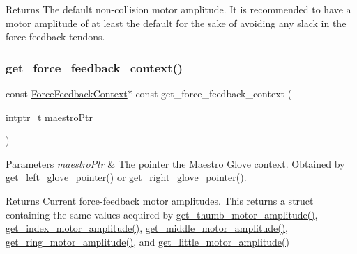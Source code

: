 \begin{DoxyReturn}{Returns}
The default non-\/collision motor amplitude. It is recommended to have a motor amplitude of at least the default for the sake of avoiding any slack in the force-\/feedback tendons. 
\end{DoxyReturn}
\mbox{\label{group__force_feedback_control_ga6017d2145085cfc8f6d455a29006a640}} 
\subsubsection{\texorpdfstring{get\+\_\+force\+\_\+feedback\+\_\+context()}{get\_force\_feedback\_context()}}
{\footnotesize\ttfamily const \hyperlink{struct_force_feedback_context}{Force\+Feedback\+Context}$\ast$ const get\+\_\+force\+\_\+feedback\+\_\+context (\begin{DoxyParamCaption}\item[{intptr\+\_\+t}]{maestro\+Ptr }\end{DoxyParamCaption})}


\begin{DoxyParams}{Parameters}
{\em maestro\+Ptr} & The pointer the Maestro Glove context. Obtained by \hyperlink{group__glove_management_ga63ce3c99d4a8b8db851b22af9185764e}{get\+\_\+left\+\_\+glove\+\_\+pointer()} or \hyperlink{group__glove_management_ga9b8fd9d91aeac3f8da50f7a7eba0c32b}{get\+\_\+right\+\_\+glove\+\_\+pointer()}. \\
\hline
\end{DoxyParams}
\begin{DoxyReturn}{Returns}
Current force-\/feedback motor amplitudes. This returns a struct containing the same values acquired by {\ttfamily \hyperlink{group__force_feedback_control_ga54aef0ba5f346eb893bb9e18bdd9a7c6}{get\+\_\+thumb\+\_\+motor\+\_\+amplitude()}}, {\ttfamily \hyperlink{group__force_feedback_control_ga8449502fafb4bb8b163ba2fa2ef9d743}{get\+\_\+index\+\_\+motor\+\_\+amplitude()}}, {\ttfamily \hyperlink{group__force_feedback_control_ga8d6036a18ed2a0a977fbd861b373f389}{get\+\_\+middle\+\_\+motor\+\_\+amplitude()}}, {\ttfamily \hyperlink{group__force_feedback_control_ga10d53dad9720a77b092ff74d7d7c4111}{get\+\_\+ring\+\_\+motor\+\_\+amplitude()}}, and {\ttfamily \hyperlink{group__force_feedback_control_ga2c77aacc777827da2ac43e0e171d65f0}{get\+\_\+little\+\_\+motor\+\_\+amplitude()}} 
\end{DoxyReturn}
\mbox{\label{group__force_feedback_control_ga8449502fafb4bb8b163ba2fa2ef9d743}} 

